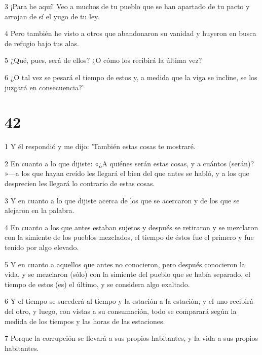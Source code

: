 \par 3 ¡Para he aquí! Veo a muchos de tu pueblo que se han apartado de tu pacto y arrojan de sí el yugo de tu ley.

\par 4 Pero también he visto a otros que abandonaron su vanidad y huyeron en busca de refugio bajo tus alas.

\par 5 ¿Qué, pues, será de ellos? ¿O cómo los recibirá la última vez?

\par 6 ¿O tal vez se pesará el tiempo de estos y, a medida que la viga se incline, se los juzgará en consecuencia?'

\chapter{42}

\par 1 Y él respondió y me dijo: 'También estas cosas te mostraré.

\par 2 En cuanto a lo que dijiste: «¿A quiénes serán estas cosas, y a cuántos (serán)? »—a los que hayan creído les llegará el bien del que antes se habló, y a los que desprecien les llegará lo contrario de estas cosas.

\par 3 Y en cuanto a lo que dijiste acerca de los que se acercaron y de los que se alejaron en la palabra.

\par 4 En cuanto a los que antes estaban sujetos y después se retiraron y se mezclaron con la simiente de los pueblos mezclados, el tiempo de éstos fue el primero y fue tenido por algo elevado.

\par 5 Y en cuanto a aquellos que antes no conocieron, pero después conocieron la vida, y se mezclaron (sólo) con la simiente del pueblo que se había separado, el tiempo de estos (es) el último, y se considera algo exaltado.

\par 6 Y el tiempo se sucederá al tiempo y la estación a la estación, y el uno recibirá del otro, y luego, con vistas a su consumación, todo se comparará según la medida de los tiempos y las horas de las estaciones.

\par 7 Porque la corrupción se llevará a sus propios habitantes, y la vida a sus propios habitantes.

